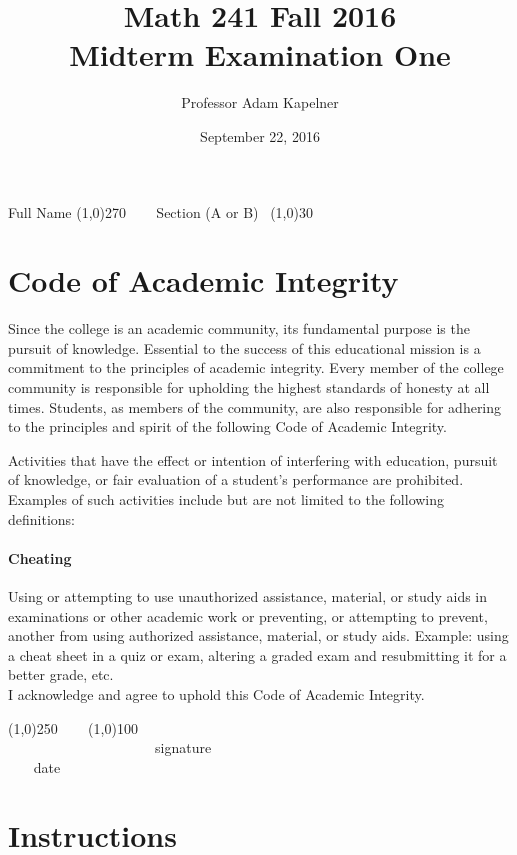 \documentclass[12pt]{article}
\title{Math 241 Fall 2016 \\ Midterm Examination One}
\author{Professor Adam Kapelner}
\date{September 22, 2016}
\begin{document}
\maketitle

\noindent Full Name \line(1,0){270} ~~~ Section (A or B)~ \line(1,0){30}

\thispagestyle{empty}

\section*{Code of Academic Integrity}

\footnotesize
Since the college is an academic community, its fundamental purpose is the pursuit of knowledge. Essential to the success of this educational mission is a commitment to the principles of academic integrity. Every member of the college community is responsible for upholding the highest standards of honesty at all times. Students, as members of the community, are also responsible for adhering to the principles and spirit of the following Code of Academic Integrity.

Activities that have the effect or intention of interfering with education, pursuit of knowledge, or fair evaluation of a student's performance are prohibited. Examples of such activities include but are not limited to the following definitions:

\paragraph{Cheating} Using or attempting to use unauthorized assistance, material, or study aids in examinations or other academic work or preventing, or attempting to prevent, another from using authorized assistance, material, or study aids. Example: using a cheat sheet in a quiz or exam, altering a graded exam and resubmitting it for a better grade, etc.
\\

\noindent I acknowledge and agree to uphold this Code of Academic Integrity. \\

\begin{center}
\line(1,0){250} ~~~ \line(1,0){100}\\
~~~~~~~~~~~~~~~~~~~~~signature~~~~~~~~~~~~~~~~~~~~~~~~~~~~~~~~~~~~~~~~~~~~~ date
\end{center}

\normalsize

\section*{Instructions}
\end{document}
